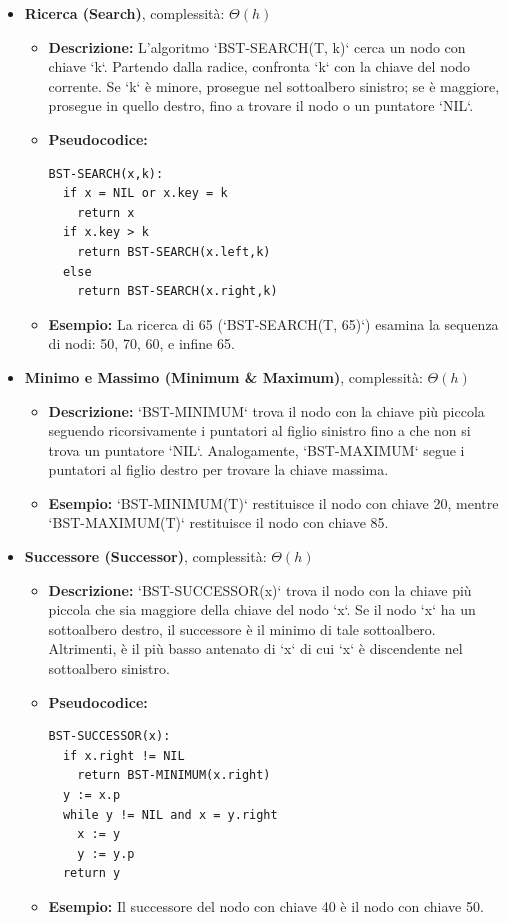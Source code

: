 \begin{itemize}
    \item \textbf{Ricerca (Search)}, complessità: $\Theta(h)$
    \begin{itemize}
        \item \textbf{Descrizione:} L'algoritmo `BST-SEARCH(T, k)` cerca un nodo con chiave `k`. Partendo dalla radice, confronta `k` con la chiave del nodo corrente. Se `k` è minore, prosegue nel sottoalbero sinistro; se è maggiore, prosegue in quello destro, fino a trovare il nodo o un puntatore `NIL`.
        \item \textbf{Pseudocodice:}
        \begin{verbatim}
BST-SEARCH(x,k):
  if x = NIL or x.key = k
    return x
  if x.key > k
    return BST-SEARCH(x.left,k)
  else 
    return BST-SEARCH(x.right,k)
        \end{verbatim}
        \item \textbf{Esempio:} La ricerca di 65 (`BST-SEARCH(T, 65)`) esamina la sequenza di nodi: 50, 70, 60, e infine 65.
    \end{itemize}

    \item \textbf{Minimo e Massimo (Minimum \& Maximum)}, complessità: $\Theta(h)$
    \begin{itemize}
        \item \textbf{Descrizione:} `BST-MINIMUM` trova il nodo con la chiave più piccola seguendo ricorsivamente i puntatori al figlio sinistro fino a che non si trova un puntatore `NIL`. Analogamente, `BST-MAXIMUM` segue i puntatori al figlio destro per trovare la chiave massima.
        \item \textbf{Esempio:} `BST-MINIMUM(T)` restituisce il nodo con chiave 20, mentre `BST-MAXIMUM(T)` restituisce il nodo con chiave 85.
    \end{itemize}
    
    \item \textbf{Successore (Successor)}, complessità: $\Theta(h)$
    \begin{itemize}
        \item \textbf{Descrizione:} `BST-SUCCESSOR(x)` trova il nodo con la chiave più piccola che sia maggiore della chiave del nodo `x`. Se il nodo `x` ha un sottoalbero destro, il successore è il minimo di tale sottoalbero. Altrimenti, è il più basso antenato di `x` di cui `x` è discendente nel sottoalbero sinistro.
        \item \textbf{Pseudocodice:}
        \begin{verbatim}
BST-SUCCESSOR(x):
  if x.right != NIL
    return BST-MINIMUM(x.right)
  y := x.p
  while y != NIL and x = y.right
    x := y
    y := y.p
  return y
        \end{verbatim}
        \item \textbf{Esempio:} Il successore del nodo con chiave 40 è il nodo con chiave 50.
    \end{itemize}


\end{itemize}
